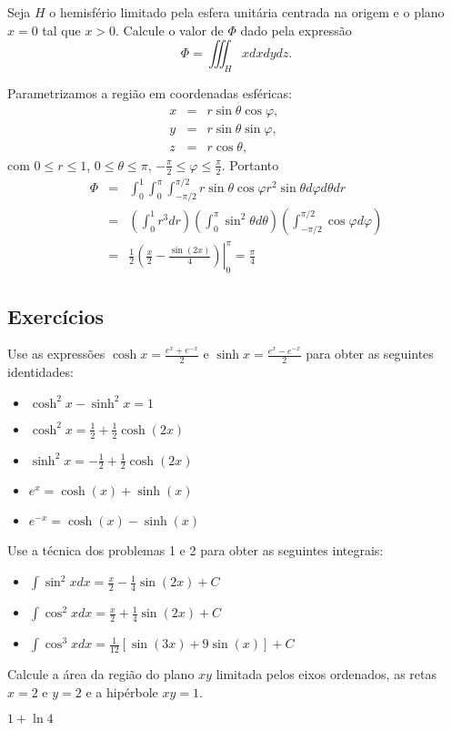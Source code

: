 \begin{exeresol} Seja $H$ o hemisfério limitado pela esfera unitária centrada na origem e o plano $x=0$ tal que $x>0$. Calcule o valor de $\Phi$ dado pela expressão
$$\Phi=\iiint_Hx dxdydz.$$ 
\end{exeresol}
\begin{resol}Parametrizamos a região em coordenadas esféricas:
\begin{eqnarray*}
x&=&r\sin\theta\cos\varphi,\\ y&=&r\sin\theta\sin\varphi,\qquad \\z&=&r\cos\theta,
\end{eqnarray*}
com $0\leq r \leq 1$, $0\leq \theta\leq {\pi}$, $-\frac{\pi}{2}\leq \varphi\leq \frac{\pi}{2}$.  
Portanto
\begin{eqnarray*}
\Phi&=&\int_0^1\int_0^\pi\int_{-\pi/2}^{\pi/2}r\sin\theta\cos\varphi r^2\sin\theta d\varphi d\theta dr\\
&=&\left(\int_0^1r^3dr\right)\left(\int_0^\pi\sin^2\theta d\theta \right)\left(\int_{-\pi/2}^{\pi/2}\cos\varphi d\varphi\right)\\
&=&\frac{1}{2}\left.\left(\frac{x}{2}-\frac{\sin(2x)}{4}\right)\right|_0^{\pi}=\frac{\pi}{4}
\end{eqnarray*}
\end{resol}


\subsection*{Exercícios}


\begin{exer}Use as expressões $\cosh x=\frac{e^x+e^{-x}}{2}$ e $\sinh x=\frac{e^x-e^{-x}}{2}$ para obter as seguintes identidades:
\begin{itemize}
\item $\cosh^2x-\sinh^2x=1$
\item $\cosh^2x=\frac{1}{2}+\frac{1}{2}\cosh(2x)$
\item $\sinh^2x=-\frac{1}{2}+\frac{1}{2}\cosh(2x)$
\item $e^x=\cosh(x)+\sinh(x)$
\item $e^{-x}=\cosh(x)-\sinh(x)$

\end{itemize}
\end{exer}

\begin{exer}Use a técnica dos problemas 1 e 2 para obter as seguintes integrais:
\begin{itemize}
\item $\int \sin^2xdx=\frac{x}{2}-\frac{1}{4}\sin(2x)+C$
\item $\int \cos^2xdx=\frac{x}{2}+\frac{1}{4}\sin(2x)+C$
\item $\int \cos^3xdx=\frac{1}{12}\left[\sin(3x)+9\sin(x)\right]+C$
\end{itemize}
\end{exer}


\begin{exer}Calcule a área da região do plano $xy$ limitada pelos eixos ordenados, as retas $x=2$ e $y=2$ e a hipérbole $xy=1$.
\end{exer}
\begin{resp}
$1+\ln4$ 
\end{resp}


